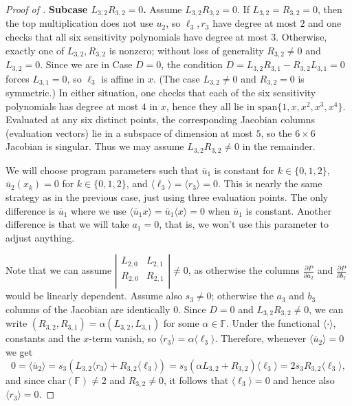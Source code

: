 \begin{proof}[Proof of ]
\smallskip
\noindent\textbf{Subcase $L_{3,2}R_{3,2}=0$.}
Assume $L_{3,2}R_{3,2}=0$.
If $L_{3,2}=R_{3,2}=0$, then the top multiplication does not use $u_2$, so $\ell_3,r_3$ have degree at most $2$ and one checks that all six sensitivity polynomials have degree at most $3$.
Otherwise, exactly one of $L_{3,2},R_{3,2}$ is nonzero; without loss of generality $R_{3,2}\neq 0$ and $L_{3,2}=0$.
Since we are in Case $D=0$, the condition
\(
D=L_{3,2}R_{3,1}-R_{3,2}L_{3,1}=0
\)
forces $L_{3,1}=0$, so $\ell_3$ is affine in $x$.
(The case $L_{3,2}\neq 0$ and $R_{3,2}=0$ is symmetric.)
In either situation, one checks that each of the six sensitivity polynomials has degree at most $4$ in $x$, hence they all lie in $\mathrm{span}\{1,x,x^2,x^3,x^4\}$.
Evaluated at any six distinct points, the corresponding Jacobian columns (evaluation vectors) lie in a subspace of dimension at most $5$, so the $6\times 6$ Jacobian is singular.
Thus we may assume $L_{3,2}R_{3,2}\neq 0$ in the remainder.

We will choose program parameters such that $\bar u_1$ is constant for $k\in\{0,1,2\}$, $\bar u_2(x_k) = 0$ for $k\in\{0,1,2\}$, and $\langle \ell_3 \rangle = \langle r_3 \rangle = 0$.
This is nearly the same strategy as in the previous case, just using three evaluation points.
The only difference is $\bar u_1$ where we use $\langle \bar u_1 x \rangle = \bar u_1 \langle x \rangle = 0$ when $\bar u_1$ is constant.
Another difference is that we will take $a_1=0$, that is, we won't use this parameter to adjust anything.

Note that we can assume
\(
\left|
\begin{matrix}
   L_{2,0} & L_{2,1} \\
   R_{2,0} & R_{2,1} \\
\end{matrix}
\right|
\neq 0
\),
as otherwise the columns $\frac{\partial P}{\partial a_2}$ and $\frac{\partial P}{\partial b_2}$ would be linearly dependent.
Assume also $s_3\neq 0$; otherwise the $a_3$ and $b_3$ columns of the Jacobian are identically $0$.
Since $D=0$ and $L_{3,2}R_{3,2}\neq 0$, we can write
$(R_{3,2}, R_{3,1}) = \alpha (L_{3,2}, L_{3,1})$ for some $\alpha \in \mathbb{F}$.
Under the functional $\langle\cdot\rangle$, constants and the $x$-term vanish, so $\langle r_3 \rangle = \alpha \langle \ell_3 \rangle$.
Therefore, whenever $\langle \bar u_2 \rangle = 0$ we get
\[
   0
   = \langle \bar u_2 \rangle
   = s_3(L_{3,2} \langle r_3 \rangle + R_{3,2} \langle \ell_3 \rangle)
   = s_3(\alpha L_{3,2} + R_{3,2}) \langle \ell_3 \rangle
   = 2s_3 R_{3,2} \langle \ell_3 \rangle,
\]
and since $\mathrm{char}(\mathbb{F})\neq 2$ and $R_{3,2}\neq 0$, it follows that
$\langle \ell_3 \rangle = 0$ and hence also $\langle r_3 \rangle = 0$.


\end{proof}
